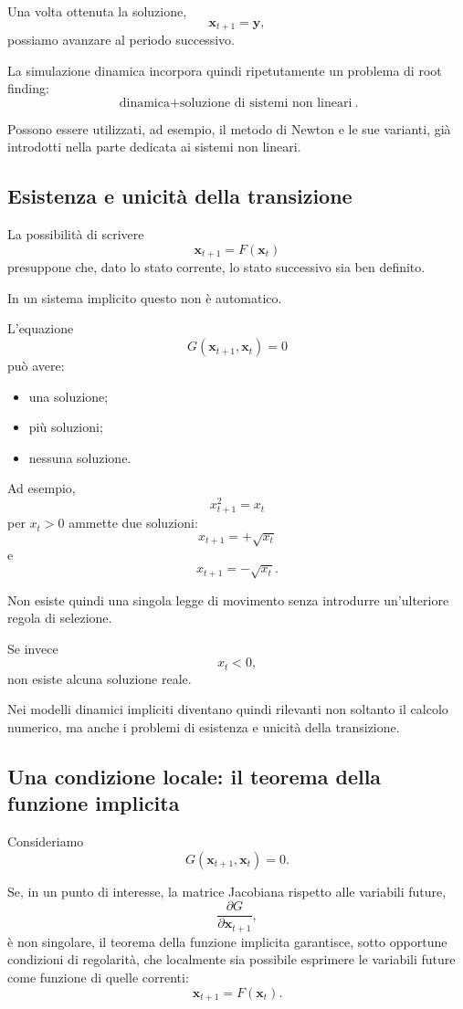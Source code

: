 \documentclass{book}
\begin{document}
Una volta ottenuta la soluzione,
\[
\mathbf{x}_{t+1}=\mathbf{y},
\]
possiamo avanzare al periodo successivo.

La simulazione dinamica incorpora quindi ripetutamente un problema di
root finding:
\[
\boxed{
\text{dinamica}
+
\text{soluzione di sistemi non lineari}
}.
\]

Possono essere utilizzati, ad esempio, il metodo di Newton e le sue
varianti, già introdotti nella parte dedicata ai sistemi non lineari.


\subsection{Esistenza e unicità della transizione}

La possibilità di scrivere
\[
\mathbf{x}_{t+1}=F(\mathbf{x}_t)
\]
presuppone che, dato lo stato corrente, lo stato successivo sia ben
definito.

In un sistema implicito questo non è automatico.

L'equazione
\[
G(\mathbf{x}_{t+1},\mathbf{x}_t)=0
\]
può avere:

\begin{itemize}
    \item una soluzione;
    \item più soluzioni;
    \item nessuna soluzione.
\end{itemize}

Ad esempio,
\[
x_{t+1}^2=x_t
\]
per $x_t>0$ ammette due soluzioni:
\[
x_{t+1}=+\sqrt{x_t}
\]
e
\[
x_{t+1}=-\sqrt{x_t}.
\]

Non esiste quindi una singola legge di movimento senza introdurre
un'ulteriore regola di selezione.

Se invece
\[
x_t<0,
\]
non esiste alcuna soluzione reale.

Nei modelli dinamici impliciti diventano quindi rilevanti non soltanto il
calcolo numerico, ma anche i problemi di esistenza e unicità della
transizione.


\subsection{Una condizione locale: il teorema della funzione implicita}

Consideriamo
\[
G(\mathbf{x}_{t+1},\mathbf{x}_t)=0.
\]

Se, in un punto di interesse, la matrice Jacobiana rispetto alle variabili
future,
\[
\frac{\partial G}
{\partial\mathbf{x}_{t+1}},
\]
è non singolare, il teorema della funzione implicita garantisce, sotto
opportune condizioni di regolarità, che localmente sia possibile esprimere
le variabili future come funzione di quelle correnti:
\[
\mathbf{x}_{t+1}=F(\mathbf{x}_t).
\]
\end{document}
